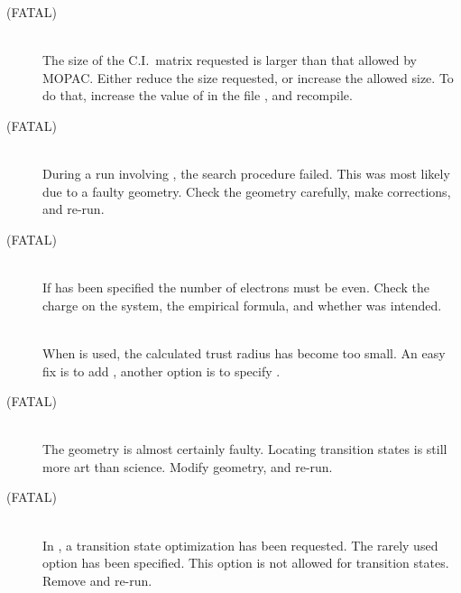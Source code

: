 \begin{description}
\item[ (FATAL)]~\\
The size of the C.I.\ matrix requested is larger than that allowed by
MOPAC.  Either reduce the size requested, or increase the allowed size.
To do that, increase the value of  in the file ,
and recompile.
 
\item[ (FATAL)]~\\
During a run involving , the search procedure failed.
This was most likely due to a faulty geometry.  Check the geometry
carefully, make corrections, and re-run.
 
\item[ (FATAL)]~\\
If  has been specified the number of electrons must be even.
Check  the  charge  on  the  system,  the empirical formula, and whether 
 was intended.

\item[]~\\
When  is used, the calculated trust radius has become too small.
An easy fix is to add , another option is to specify .
 
\item[ (FATAL)]~\\
The geometry is almost certainly faulty.  Locating transition states
is still more art than science.  Modify geometry, and re-run.

\item[ (FATAL)]~\\
In , a transition state optimization has been requested.  
The rarely used option  has been specified.  This option
is not allowed for transition states.  Remove  and re-run.
               

\end{description}
